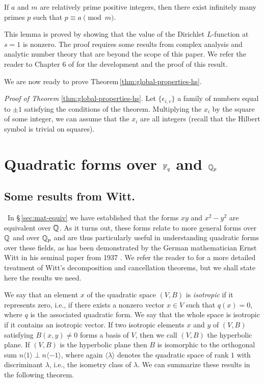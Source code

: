 \medskip

\begin{lemma}\label{lem:dirichlet}
    {\normalfont\cite[p.~25]{serre2012course}}
    If \(a\) and \(m\) are relatively prime positive integers, then there exist infinitely many primes \(p\) such that \(p \equiv a \pmod{m}\).
\end{lemma}

This lemma is proved by showing that the value of the Dirichlet \(L\)-function at \(s = 1\) is nonzero. The proof requires some results from complex analysis and analytic number theory that are beyond the scope of this paper. We refer the reader to Chapter 6 of \cite{serre2012course} for the development and the proof of this result.

We are now ready to prove Theorem\,\ref{thm:global-properties-hs}.

\emph{Proof of Theorem} \ref{thm:global-properties-hs}. Let \(\{\epsilon_{i,v}\}\) a family of numbers equal to \(\pm 1\) satisfying the conditions of the theorem. Multiplying the \(x_i\) by the square of some integer, we can assume that the \(x_i\) are all integers (recall that the Hilbert symbol is trivial on squares).

\section{Quadratic forms over \(\mathbb{F}_q\) and \(\mathbb{Q}_p\)}

\subsection{Some results from Witt.}~In \S\,\ref{sec:mat-equiv} we have established that the forms \(xy\) and \(x^2 - y^2\) are equivalent over \(\mathbb{Q}\). As it turns out, these forms relate to more general forms over \(\mathbb{Q}\) and over \(\mathbb{Q}_p\) and are thus particularly useful in understanding quadratic forms over these fields, as has been demonstrated by the German mathematician Ernst Witt in his seminal paper from 1937 \cite{witt1937theorie}. We refer the reader to \cite{lam1973quadratic} for a more detailed treatment of Witt's decomposition and cancellation theorems, but we shall state here the results we need.\label{sec:results-from-witt}

We say that an element \(x\) of the quadratic space \((V,B)\) is \emph{isotropic} if it represents zero, i.e., if there exists a nonzero vector \(x \in V\) such that \(q(x) = 0\), where \(q\) is the associated quadratic form. We say that the whole space is isotropic if it contains an isotropic vector. If two isotropic elements \(x\) and \(y\) of \((V,B)\) satisfying \(B(x,y) \neq 0\) forms a basis of \(V\), then we call \((V, B)\) the hyperbolic plane. If \((V,B)\) is the hyperbolic plane then \(B\) is isomorphic to the orthogonal sum \(n\langle 1 \rangle \perp n \langle -1 \rangle\), where again \(\langle \lambda \rangle\) denotes the quadratic space of rank \(1\) with discriminant \(\lambda\), i.e., the isometry class of \(\lambda\). We can summarize these results in the following theorem.

